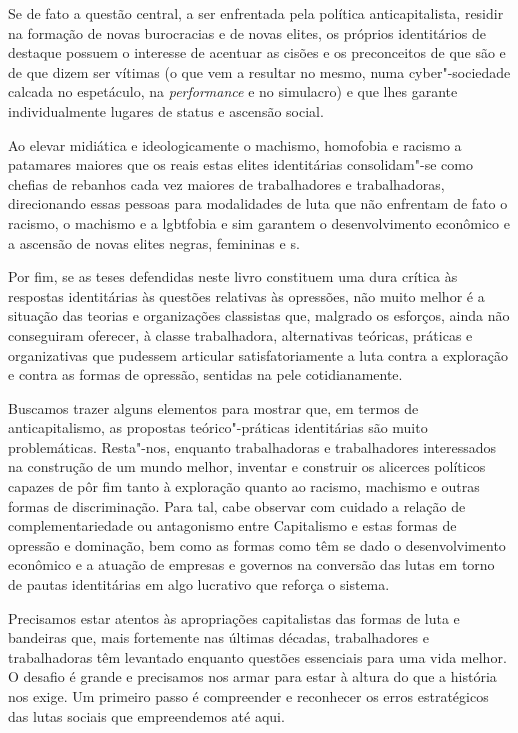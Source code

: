 Se de fato a questão central, a ser enfrentada pela política
anticapitalista, residir na formação de novas burocracias e de novas
elites, os próprios identitários de destaque possuem o interesse de
acentuar as cisões e os preconceitos de que são e de que dizem ser
vítimas (o que vem a resultar no mesmo, numa cyber"-sociedade calcada no
espetáculo, na \emph{performance} e no simulacro) e que lhes garante
individualmente lugares de status e ascensão social.

Ao elevar midiática e ideologicamente o machismo, homofobia e racismo a
patamares maiores que os reais estas elites identitárias consolidam"-se
como chefias de rebanhos cada vez maiores de trabalhadores e
trabalhadoras, direcionando essas pessoas para modalidades de luta que
não enfrentam de fato o racismo, o machismo e a lgbtfobia e sim garantem
o desenvolvimento econômico e a ascensão de novas elites negras,
femininas e s.

Por fim, se as teses defendidas neste livro constituem uma dura crítica
às respostas identitárias às questões relativas às opressões, não muito
melhor é a situação das teorias e organizações classistas que, malgrado
os esforços, ainda não conseguiram oferecer, à classe trabalhadora,
alternativas teóricas, práticas e organizativas que pudessem articular
satisfatoriamente a luta contra a exploração e contra as formas de
opressão, sentidas na pele cotidianamente.

Buscamos trazer alguns elementos para mostrar que, em termos de
anticapitalismo, as propostas teórico"-práticas identitárias são muito
problemáticas. Resta"-nos, enquanto trabalhadoras e trabalhadores
interessados na construção de um mundo melhor, inventar e construir os
alicerces políticos capazes de pôr fim tanto à exploração quanto ao
racismo, machismo e outras formas de discriminação. Para tal, cabe
observar com cuidado a relação de complementariedade ou antagonismo
entre Capitalismo e estas formas de opressão e dominação, bem como as
formas como têm se dado o desenvolvimento econômico e a atuação de
empresas e governos na conversão das lutas em torno de pautas
identitárias em algo lucrativo que reforça o sistema.

Precisamos estar atentos às apropriações capitalistas das formas de luta
e bandeiras que, mais fortemente nas últimas décadas, trabalhadores e
trabalhadoras têm levantado enquanto questões essenciais para uma vida
melhor. O desafio é grande e precisamos nos armar para estar à altura do
que a história nos exige. Um primeiro passo é compreender e reconhecer
os erros estratégicos das lutas sociais que empreendemos até aqui.


